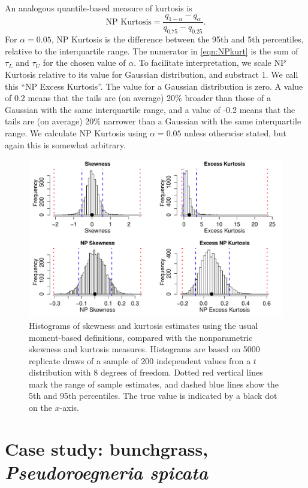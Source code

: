 \documentclass[11pt]{article}
\newcounter{box}
\newcommand{\be}{\begin{equation}}
\newcommand{\ee}{\end{equation}}
\begin{document}
{An analogous quantile-based measure of kurtosis \citep{jones-etal-1994} is 
\be
\mbox{NP Kurtosis}  = \frac{q_{1-\alpha} - q_{\alpha}}{q_{0.75} - q_{0.25}}.
\label{eqn:NPkurt}
\ee
For $\alpha=0.05$, NP Kurtosis is the difference between the 95th and 5th percentiles, relative to the interquartile range. 
The numerator in \eqref{eqn:NPkurt} is the sum of $\tau_L$ and $\tau_U$ for the chosen value of $\alpha$. 
To facilitate interpretation, we scale NP Kurtosis relative to its value for Gaussian distribution, and substract 1. 
We call this ``NP Excess Kurtosis''. The value for a Gaussian distribution is zero. A value of 0.2 means that the tails
are (on average) 20\% broader than those of a Gaussian with the same interquartile range, and a value of -0.2 means that the tails
are (on average) 20\% narrower than a Gaussian with the same interquartile range. We calculate NP Kurtosis using $\alpha=0.05$ 
unless otherwise stated, but again this is somewhat arbitrary. 

\begin{figure}[tbp]
\centering
\includegraphics[width=\textwidth]{figures/NPmoments.pdf}
\caption{Histograms of skewness and kurtosis estimates using the usual moment-based definitions, compared with the nonparametric
skewness and kurtosis measures. Histograms are based on 5000 replicate draws of a sample of 200 independent values fron 
a $t$ distribution with 8 degrees of freedom. Dotted red vertical lines mark the range of sample estimates, 
and dashed blue lines show the 5th and 95th percentiles. The true value is indicated by a black dot on the $x$-axis.}
\label{fig:NPmoments}
\end{figure} 

\section{Case study: bunchgrass, \emph{Pseudoroegneria spicata}}

}
\end{document}
